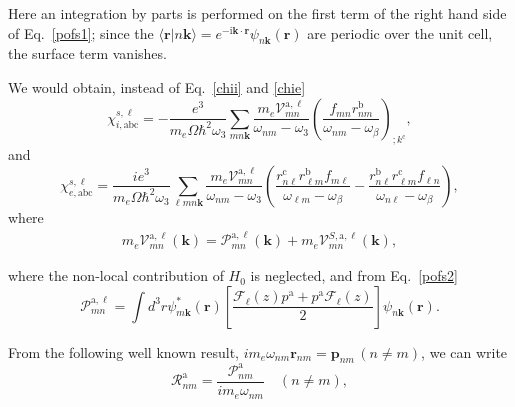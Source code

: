 Here an integration by parts is performed on the first term of the
right hand side of Eq.~\eqref{pofs1}; since the
$\langle\mathbf{r}\vert n\mathbf{k}\rangle=e^{-\mathrm{i}\mathbf{k}\cdot\mathbf{r}}\psi_{n\mathbf{k}}(\mathbf{r})$ 
are periodic over the unit cell, the surface term vanishes. 

We would obtain,
instead of Eq.~\eqref{chii} and \eqref{chie}
\begin{equation}\label{chiinl}
\chi_{i,\mathrm{a}\mathrm{b}\mathrm{c}}^{s,\ell}=-\frac{e^3}{m_e\Omega\hbar^2\omega_3}\sum_{mn\mathbf{k}}
\frac{m_e\mathcal{V}_{mn}^{\mathrm{a},\ell}}{\omega_{nm}-\omega_3}
\left(\frac{f_{mn}r_{nm}^{\mathrm{b}}}{\omega_{nm}-\omega_\beta}\right)_{;k^{\mathrm{c}}},
\end{equation}
and
\begin{equation}\label{chienl}
\chi_{e,\mathrm{a}\mathrm{b}\mathrm{c}}^{s,\ell}=\frac{ie^3}{m_e\Omega\hbar^2\omega_3}\sum_{\ell mn\mathbf{k}}
\frac{m_e\mathcal{V}_{mn}^{\mathrm{a},\ell}}{\omega_{nm}-\omega_3}
\left(
\frac{r_{n\ell}^{\mathrm{c}} r_{\ell m}^{\mathrm{b}}
f_{m\ell}}{\omega_{\ell m}-\omega_\beta}
-\frac{r_{n\ell}^{\mathrm{b}} r_{\ell m}^{\mathrm{c}}
f_{\ell n}}{\omega_{n \ell}-\omega_\beta}
\right),
\end{equation}
where
\begin{align}\label{nl.5}
m_e\mathcal{V}_{mn}^{\mathrm{a},\ell}(\mathbf{k})=
\mathcal{P}^{\mathrm{a},\ell}_{mn}(\mathbf{k})
+
m_e\mathcal{V}^{S,\mathrm{a},\ell}_{mn}(\mathbf{k})
,
\end{align}

where the non-local contribution of $H_0$ is neglected, and from Eq.~\eqref{pofs2}
\begin{equation}\label{calpmn}
\mathcal{P}_{mn}^{\mathrm{a},\ell}=\int d^3 r
\psi^*_{m\mathbf{k}}(\mathbf{r})
\left[\frac{\mathcal{F}_\ell(z) p^{\mathrm{a}} +
p^{\mathrm{a}} \mathcal{F}_\ell(z)}{2}\right]
\psi_{n\mathbf{k}}(\mathbf{r}).
\end{equation}

From the following well known result,
$im_e\omega_{nm}\mathbf{r}_{nm}=\mathbf{p}_{nm}\,(n\neq m)$, 
we can write
\begin{equation}\label{rcal}
\mathcal{R}^{\mathrm{a}}_{nm}=\frac{\mathcal{P}^{\mathrm{a}}_{nm}}{im_e\omega_{nm}}\quad(n\neq m)
,
\end{equation} 


\stopcontents[chapters]
